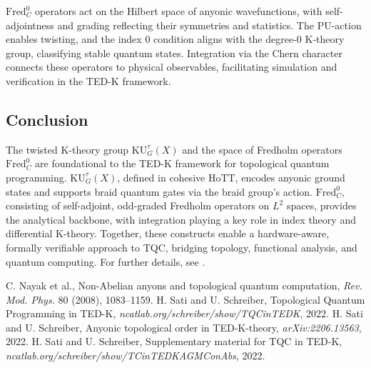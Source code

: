 \documentclass{article}
\theoremstyle{definition}
\begin{document}
\(\text{Fred}^0_C\) operators act on the Hilbert space of anyonic wavefunctions, with self-adjointness and grading reflecting their symmetries and statistics. The \(\mathrm{PU}\)-action enables twisting, and the index 0 condition aligns with the degree-0 K-theory group, classifying stable quantum states. Integration via the Chern character connects these operators to physical observables, facilitating simulation and verification in the TED-K framework.

\subsection{Conclusion}

The twisted K-theory group \(\mathrm{KU}^\tau_G(X)\) and the space of Fredholm operators \(\text{Fred}^0_C\) are foundational to the TED-K framework for topological quantum programming. \(\mathrm{KU}^\tau_G(X)\), defined in cohesive HoTT, encodes anyonic ground states and supports braid quantum gates via the braid group’s action. \(\text{Fred}^0_C\), consisting of self-adjoint, odd-graded Fredholm operators on \(L^2\) spaces, provides the analytical backbone, with integration playing a key role in index theory and differential K-theory. Together, these constructs enable a hardware-aware, formally verifiable approach to TQC, bridging topology, functional analysis, and quantum computing. For further details, see \cite{SatiSchreiber2022Supplementary}.

\begin{thebibliography}{9}
 C. Nayak et al., Non-Abelian anyons and topological quantum computation, \emph{Rev. Mod. Phys.} 80 (2008), 1083--1159.
 H. Sati and U. Schreiber, Topological Quantum Programming in TED-K, \emph{ncatlab.org/schreiber/show/TQCinTEDK}, 2022.
 H. Sati and U. Schreiber, Anyonic topological order in TED-K-theory, \emph{arXiv:2206.13563}, 2022.
 H. Sati and U. Schreiber, Supplementary material for TQC in TED-K, \emph{ncatlab.org/schreiber/show/TCinTEDKAGMConAbs}, 2022.
\end{thebibliography}
\end{document}
